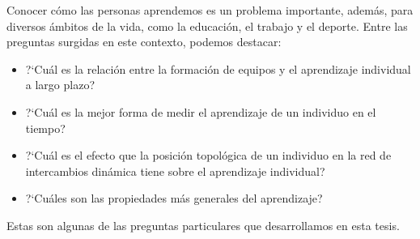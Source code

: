 \documentclass[a4paper,11pt]{book}
\theoremstyle{definition}
\begin{document}
Conocer c\'omo las personas aprendemos es un problema importante, adem\'as, para diversos \'ambitos de la vida, como la educaci\'on, el trabajo y el deporte.
Entre las preguntas surgidas en este contexto, podemos destacar:
\begin{itemize}
\item ?`Cu\'al es la relaci\'on entre la formaci\'on de equipos y el aprendizaje individual a largo plazo?

\item ?`Cu\'al es la mejor forma de medir el aprendizaje de un individuo en el tiempo?

\item ?`Cu\'al es el efecto que la posici\'on topol\'ogica de un individuo en la red de intercambios din\'amica tiene sobre el aprendizaje individual?

\item ?`Cu\'ales son las propiedades m\'as generales del aprendizaje?

\end{itemize}
Estas son algunas de las preguntas particulares que desarrollamos en esta tesis.
%
%
\end{document}
